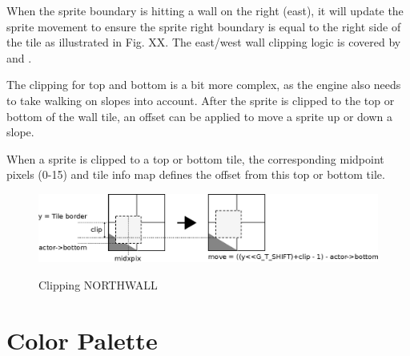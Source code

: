 \documentclass[book.tex]{subfiles}
\begin{document}
\par
When the sprite boundary is hitting a wall on the right (east), it will update the sprite movement to ensure the sprite right boundary is equal to the right side of the tile as illustrated in Fig. XX. The east/west wall clipping logic is covered by  and . 
\\
\begin{minipage}{\textwidth}
  
\end{minipage}
\label{wallclip_array}
\par
The clipping for top and bottom is a bit more complex, as the engine also needs to take walking on slopes into account. After the sprite is clipped to the top or bottom of the wall tile, an offset can be applied to move a sprite up or down a slope. 
\\
\begin{minipage}{\textwidth}
  
\end{minipage}
\label{wallclip_array}
\par
When a sprite is clipped to a top or bottom tile, the corresponding midpoint pixels (0-15) and tile info map defines the offset from this top or bottom tile.
\begin{figure}[H]
  \centering
  \includegraphics[width=\textwidth]{imgs/drawings/clipping.eps}
  \label{fig:clipping_north}
  \caption{Clipping NORTHWALL}
\end{figure}

\par
\begin{minipage}{\textwidth}
  
\end{minipage}
\label{wallclip_array}
\par



\section{Color Palette}
\end{document}
